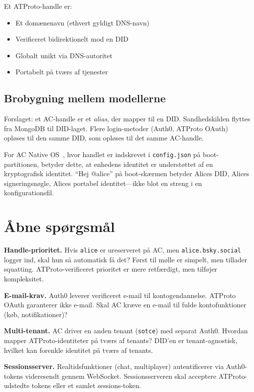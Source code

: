 \documentclass[10pt,letterpaper,twocolumn]{article}
\begin{document}
Et ATProto-handle er:
\begin{itemize}
  \item Et domænenavn (ethvert gyldigt DNS-navn)
  \item Verificeret bidirektionelt mod en DID
  \item Globalt unikt via DNS-autoritet
  \item Portabelt på tværs af tjenester
\end{itemize}

\subsection{Brobygning mellem modellerne}

Forslaget: et AC-handle er et \emph{alias}, der mapper til en DID. Sandhedskilden flyttes fra MongoDB til DID-laget. Flere login-metoder (Auth0, ATProto OAuth) opløses til den samme DID, som opløses til det samme AC-handle.

For AC Native OS~\citep{scudder2026os}, hvor handlet er indskrevet i \texttt{config.json} på boot-partitionen, betyder dette, at enhedens identitet er understøttet af en kryptografisk identitet. ``Hej @alice'' på boot-skærmen betyder Alices DID, Alices signeringsnøgle, Alices portabel identitet---ikke blot en streng i en konfigurationsfil.


\section{Åbne spørgsmål}
\label{sec:questions}

\textbf{Handle-prioritet.} Hvis \texttt{alice} er ureserveret på AC, men \texttt{alice.bsky.social} logger ind, skal hun så automatisk få det? Først til mølle er simpelt, men tillader squatting. ATProto-verificeret prioritet er mere retfærdigt, men tilføjer kompleksitet.

\textbf{E-mail-krav.} Auth0 leverer verificeret e-mail til kontogendannelse. ATProto OAuth garanterer ikke e-mail. Skal AC kræve en e-mail til fulde kontofunktioner (køb, notifikationer)?

\textbf{Multi-tenant.} AC driver en anden tenant (\texttt{sotce}) med separat Auth0. Hvordan mapper ATProto-identiteter på tværs af tenants? DID'en er tenant-agnostisk, hvilket kan forenkle identitet på tværs af tenants.

\textbf{Sessionsserver.} Realtidsfunktioner (chat, multiplayer) autentificerer via Auth0-tokens videresendt gennem WebSocket. Sessionsserveren skal acceptere ATProto-udstedte tokens eller et samlet sessions-token.
\end{document}
